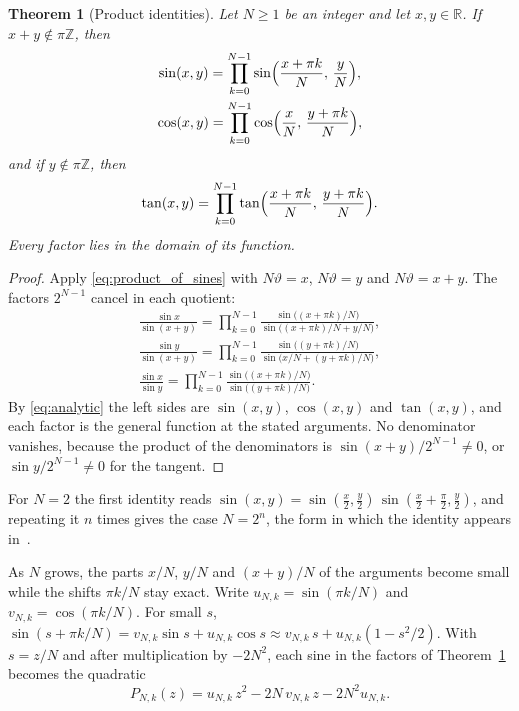 \documentclass[11pt]{amsart}
\newtheorem{thm}{Theorem}[section]
\theoremstyle{definition}
\theoremstyle{remark}
\numberwithin{equation}{section}
\begin{document}
\begin{thm}[Product identities]
\label{thm:products}
Let $N \geq 1$ be an integer and let $x, y \in \mathbb{R}$. If
$x + y \notin \pi\mathbb{Z}$, then
\begin{gather}
\label{eq:prod-sin}
\sin(x,y) = \prod_{k=0}^{N-1}\sin\Bigl(\frac{x + \pi k}{N},\, \frac{y}{N}\Bigr), \\
\label{eq:prod-cos}
\cos(x,y) = \prod_{k=0}^{N-1}\cos\Bigl(\frac{x}{N},\, \frac{y + \pi k}{N}\Bigr),
\end{gather}
and if $y \notin \pi\mathbb{Z}$, then
\begin{equation}
\label{eq:prod-tan}
\tan(x,y) = \prod_{k=0}^{N-1}\tan\Bigl(\frac{x + \pi k}{N},\, \frac{y + \pi k}{N}\Bigr).
\end{equation}
Every factor lies in the domain of its function.
\end{thm}

\begin{proof}
Apply \eqref{eq:product_of_sines} with $N\vartheta = x$, $N\vartheta = y$
and $N\vartheta = x+y$. The factors $2^{N-1}$ cancel in each quotient:
\begin{gather*}
\frac{\sin x}{\sin(x+y)} = \prod_{k=0}^{N-1}
\frac{\sin\bigl((x+\pi k)/N\bigr)}{\sin\bigl((x+\pi k)/N + y/N\bigr)}, \\
\frac{\sin y}{\sin(x+y)} = \prod_{k=0}^{N-1}
\frac{\sin\bigl((y+\pi k)/N\bigr)}{\sin\bigl(x/N + (y+\pi k)/N\bigr)}, \\
\frac{\sin x}{\sin y} = \prod_{k=0}^{N-1}
\frac{\sin\bigl((x+\pi k)/N\bigr)}{\sin\bigl((y+\pi k)/N\bigr)} .
\end{gather*}
By \eqref{eq:analytic} the left sides are $\sin(x,y)$, $\cos(x,y)$ and
$\tan(x,y)$, and each factor is the general function at the stated
arguments. No denominator vanishes, because the product of the
denominators is $\sin(x+y)/2^{N-1} \neq 0$, or $\sin y/2^{N-1} \neq 0$ for
the tangent.
\end{proof}

For $N = 2$ the first identity reads
$\sin(x,y) = \sin(\frac{x}{2},\frac{y}{2})\,\sin(\frac{x}{2}+\frac{\pi}{2},\frac{y}{2})$,
and repeating it $n$ times gives the case $N = 2^n$, the form in which the
identity appears in~\cite{GeneralSinus}.

As $N$ grows, the parts $x/N$, $y/N$ and $(x+y)/N$ of the arguments become
small while the shifts $\pi k/N$ stay exact. Write
$u_{N,k} = \sin(\pi k/N)$ and $v_{N,k} = \cos(\pi k/N)$. For small $s$,
$\sin(s + \pi k/N) = v_{N,k}\sin s + u_{N,k}\cos s \approx
v_{N,k}\,s + u_{N,k}(1 - s^2/2)$. With $s = z/N$ and after multiplication
by $-2N^2$, each sine in the factors of Theorem~\ref{thm:products} becomes
the quadratic
\begin{equation}
\label{eq:quadratic}
P_{N,k}(z) = u_{N,k}\,z^2 - 2N\,v_{N,k}\,z - 2N^2 u_{N,k} .
\end{equation}
\end{document}
